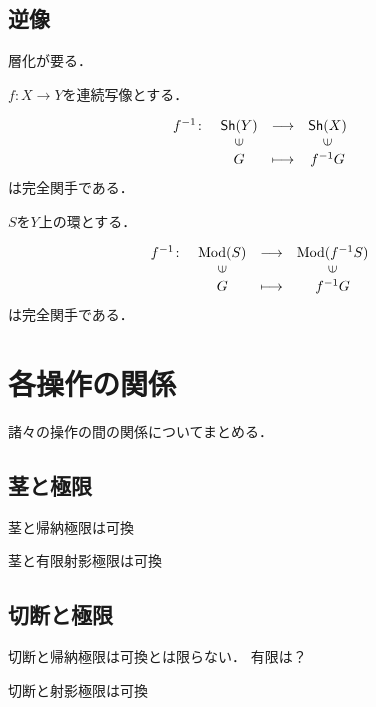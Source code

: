 \subsection{逆像}
層化が要る．

\(f\colon X\to Y\)を連続写像とする．

\begin{PRP}
    \[
        \begin{array}{rccc}
            f^{-1}\colon&   \Sh(Y) & \longrightarrow& \Sh(X) \\
            &   \rotatebox{90}{$\in$}&&\rotatebox{90}{$\in$}\\
            &   G&  \longmapsto&    f^{-1} G   
        \end{array}
    \]
    は完全関手である．
\end{PRP}


\(S\)を\(Y\)上の環とする．

\begin{PRP}
    \[
        \begin{array}{rccc}
            f^{-1}\colon&   \Mod(S)& \longrightarrow& \Mod(f^{-1}S)\\
            &   \rotatebox{90}{$\in$}&&\rotatebox{90}{$\in$}\\
            &   G&  \longmapsto&    f^{-1} G   
        \end{array}
    \]
    は完全関手である．
\end{PRP}




\section{各操作の関係}

諸々の操作の間の関係についてまとめる．

\subsection{茎と極限}
茎と帰納極限は可換

茎と有限射影極限は可換
\subsection{切断と極限}
切断と帰納極限は可換とは限らない．
有限は？

切断と射影極限は可換




























